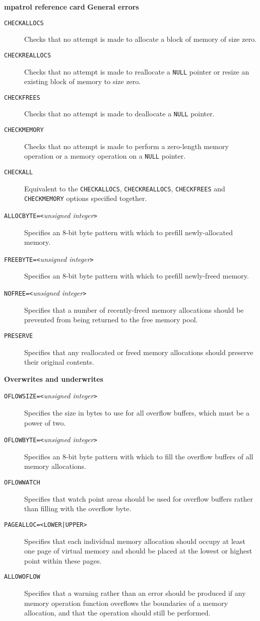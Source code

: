 \documentclass[a4paper,landscape,final]{article}
\newcommand{\heading}[1]{\textbf{\normalsize #1}}
\newcommand{\option}[1]{\texttt{#1}}
\newcommand{\optionarg}[2]{\option{#1}\texttt{=<#2>}}
\newcommand{\optionpar}[2]{\option{#1}\texttt{=<}\textit{#2}\texttt{>}}
\begin{document}
\begin{multicols}{3}{\textbf{\Large mpatrol reference card}}
\vskip 12pt
\heading{General errors}
\vskip 6pt

\begin{description}
\item[\option{CHECKALLOCS}]
Checks that no attempt is made to allocate a block of memory of size zero.
\item[\option{CHECKREALLOCS}]
Checks that no attempt is made to reallocate a \texttt{NULL} pointer or resize
an existing block of memory to size zero.
\item[\option{CHECKFREES}]
Checks that no attempt is made to deallocate a \texttt{NULL} pointer.
\item[\option{CHECKMEMORY}]
Checks that no attempt is made to perform a zero-length memory operation or a
memory operation on a \texttt{NULL} pointer.
\item[\option{CHECKALL}]
Equivalent to the \option{CHECKALLOCS}, \option{CHECKREALLOCS},
\option{CHECKFREES} and \option{CHECKMEMORY} options specified together.
\item[\optionpar{ALLOCBYTE}{unsigned integer}]
Specifies an 8-bit byte pattern with which to prefill newly-allocated memory.
\item[\optionpar{FREEBYTE}{unsigned integer}]
Specifies an 8-bit byte pattern with which to prefill newly-freed memory.
\item[\optionpar{NOFREE}{unsigned integer}]
Specifies that a number of recently-freed memory allocations should be prevented
from being returned to the free memory pool.
\item[\option{PRESERVE}]
Specifies that any reallocated or freed memory allocations should preserve their
original contents.
\end{description}

\vskip 12pt
\heading{Overwrites and underwrites}
\vskip 6pt

\begin{description}
\item[\optionpar{OFLOWSIZE}{unsigned integer}]
Specifies the size in bytes to use for all overflow buffers, which must be a
power of two.
\item[\optionpar{OFLOWBYTE}{unsigned integer}]
Specifies an 8-bit byte pattern with which to fill the overflow buffers of all
memory allocations.
\item[\option{OFLOWWATCH}]
Specifies that watch point areas should be used for overflow buffers rather than
filling with the overflow byte.
\item[\optionarg{PAGEALLOC}{LOWER|UPPER}]
Specifies that each individual memory allocation should occupy at least one page
of virtual memory and should be placed at the lowest or highest point within
these pages.
\item[\option{ALLOWOFLOW}]
Specifies that a warning rather than an error should be produced if any memory
operation function overflows the boundaries of a memory allocation, and that
the operation should still be performed.
\end{description}


\end{multicols}
\end{document}
